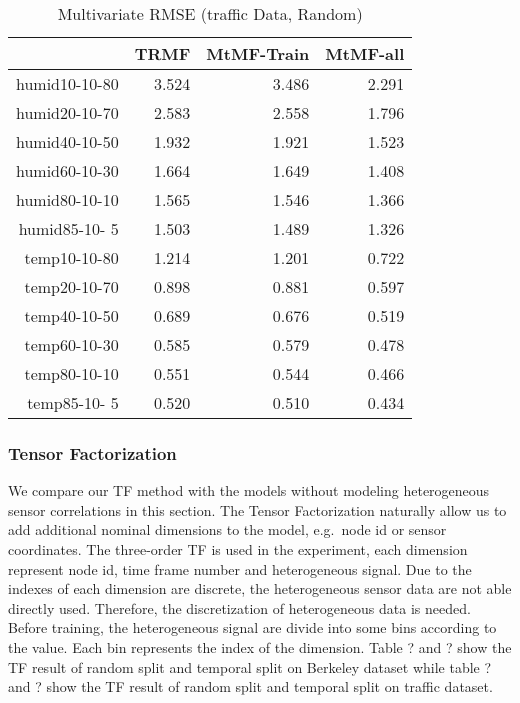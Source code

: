 \begin{table}[htbp]
\setlength{\tabcolsep}{2pt}
\centering
\caption{Multivariate RMSE (traffic Data, Random)}
\label{traffic}
\begin{tabular}{r | r r r}
	&TRMF	&MtMF-Train	&MtMF-all \\ \hline
humid10-10-80	&3.524 	&3.486 	&2.291\\  
humid20-10-70	&2.583 	&2.558 	&1.796\\
humid40-10-50	&1.932 	&1.921 	&1.523\\
humid60-10-30	&1.664 	&1.649 	&1.408\\
humid80-10-10	&1.565 	&1.546 	&1.366\\
humid85-10- 5	&1.503 	&1.489 	&1.326\\
 temp10-10-80	&1.214 	&1.201 	&0.722\\
 temp20-10-70	&0.898 	&0.881 	&0.597\\
 temp40-10-50	&0.689 	&0.676 	&0.519\\
 temp60-10-30	&0.585 	&0.579 	&0.478\\
 temp80-10-10	&0.551 	&0.544 	&0.466\\
 temp85-10- 5	&0.520 	&0.510 	&0.434\\
\end{tabular}
\end{table}

\subsubsection{Tensor Factorization} %
We compare our TF method with the models without modeling heterogeneous sensor correlations in this section.
The Tensor Factorization naturally allow us to add additional nominal dimensions to the model, e.g.\ node id or sensor coordinates.
The three-order TF is used in the experiment, each dimension represent node id, time frame number and heterogeneous signal.  
Due to the indexes of each dimension are discrete, the heterogeneous sensor data are not able directly used.
Therefore, the discretization of heterogeneous data is needed.
Before training, the heterogeneous signal are divide into some bins according to the value.
Each bin represents the index of the dimension.
Table ? and ? show the TF result of random split and temporal split on Berkeley dataset while table ? and ? show the TF result of random split and temporal split on traffic dataset.

